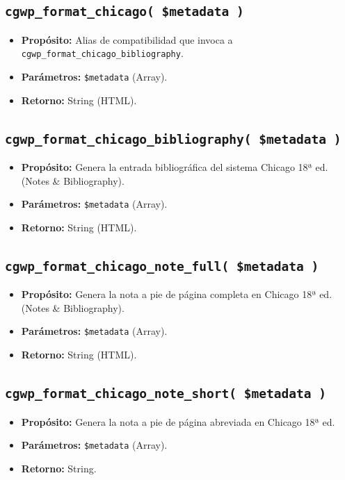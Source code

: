 \documentclass[11pt, a4paper]{article}
\begin{document}
\subsection{\texttt{cgwp\_format\_chicago( \$metadata )}}
\begin{itemize}
\item \textbf{Propósito:} Alias de compatibilidad que invoca a \texttt{cgwp\_format\_chicago\_bibliography}.
\item \textbf{Parámetros:} \texttt{\$metadata} (Array).
\item \textbf{Retorno:} String (HTML).
\end{itemize}
\subsection{\texttt{cgwp\_format\_chicago\_bibliography( \$metadata )}}
\begin{itemize}
\item \textbf{Propósito:} Genera la entrada bibliográfica del sistema Chicago 18ª ed. (Notes \& Bibliography).
\item \textbf{Parámetros:} \texttt{\$metadata} (Array).
\item \textbf{Retorno:} String (HTML).
\end{itemize}
\subsection{\texttt{cgwp\_format\_chicago\_note\_full( \$metadata )}}
\begin{itemize}
\item \textbf{Propósito:} Genera la nota a pie de página completa en Chicago 18ª ed. (Notes \& Bibliography).
\item \textbf{Parámetros:} \texttt{\$metadata} (Array).
\item \textbf{Retorno:} String (HTML).
\end{itemize}
\subsection{\texttt{cgwp\_format\_chicago\_note\_short( \$metadata )}}
\begin{itemize}
\item \textbf{Propósito:} Genera la nota a pie de página abreviada en Chicago 18ª ed.
\item \textbf{Parámetros:} \texttt{\$metadata} (Array).
\item \textbf{Retorno:} String.
\end{itemize}
\end{document}
